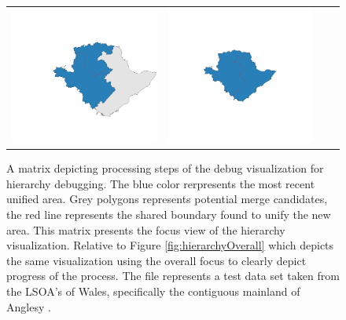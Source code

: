 \begin{figure}[p]
\begin{tabularx}{1\textwidth}{XXXX}
\includegraphics[width=1\linewidth]{images/ch6/mergefocus/22}&
\includegraphics[width=1\linewidth]{images/ch6/mergefocus/23} \\ %
\end{tabularx}
\caption{A matrix depicting processing steps of the debug visualization for hierarchy debugging. The blue color rerpresents the most recent unified area. Grey polygons represents potential merge candidates, the red line represents the shared boundary found to unify the new area. This matrix presents the focus view of the hierarchy visualization. Relative to Figure \ref{fig:hierarchyOverall} which depicts the same visualization using the overall focus to clearly depict progress of the process. The file represents a test data set taken from the LSOA's of Wales, specifically the contiguous mainland of Anglesy \cite{wales}.} \label{fig:hierarchyFocus}
\end{figure}

